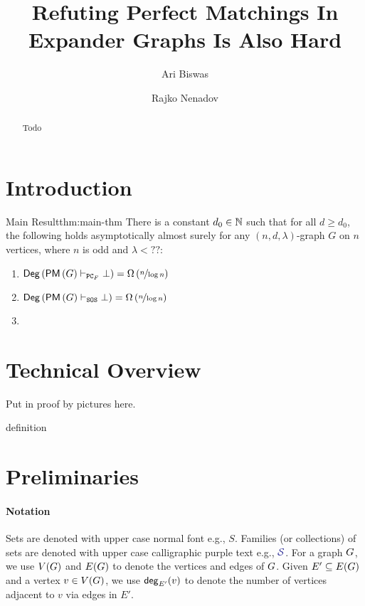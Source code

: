 \documentclass[11pt]{article}
\title{\textcolor{definitioncolor}{Refuting Perfect Matchings In Expander Graphs Is Also Hard}}
\author[1]{Ari Biswas}
\author[2]{Rajko Nenadov}
\affil[1]{\small University Of Warwick, United Kingdom}
\affil[2]{\small University Of Auckland, New Zealand}
\date{}
\newcommand{\Degree}[1]{\mathsf{Deg}\left(#1\right)}
\newcommand{\PerfectMatching}[1]{\mathsf{PM}\left(#1\right)}
\newcommand{\PC}{\vdash_{\texttt{PC}_F}}
\newcommand{\SOS}{\vdash_{\texttt{SOS}}}
\begin{document}
\maketitle
\begin{abstract}
Todo
\end{abstract}

\section{Introduction}


\begin{theorem}{Main Result}{thm:main-thm}
There is a constant $d_0 \in \mathbb{N}$ such that for all $d \geq d_0$, the following holds asymptotically almost surely for any $(n, d, \lambda)$-graph $G$ on $n$ vertices, where $n$ is odd and $\lambda < ??$:
\begin{enumerate}
    \item{ $\Degree{\PerfectMatching{G} \PC \bot} = \BigOmega{\nicefrac{n}{\log n}}$} 
    \item{$\Degree{\PerfectMatching{G} \SOS \bot} = \BigOmega{\nicefrac{n}{\log n}}$}
    \item {}
\end{enumerate}


\end{theorem}


\section{Technical Overview}

Put in proof by pictures here.

\begin{definition}
definition
\end{definition}

\section{Preliminaries}

\paragraph{Notation} Sets are denoted with upper case normal font e.g., $S$. Families (or collections) of sets are denoted with upper case calligraphic purple text e.g., $\Family{S}$. For a graph $G$, we use $V(G)$ and $E(G)$ to denote the vertices and edges of $G$. 
Given $E' \subseteq E(G)$ and a vertex $v \in V(G)$, we use $\mathsf{deg}_{E'}(v)$ to denote the number of vertices adjacent to $v$ via edges in $E'$.
\end{document}

